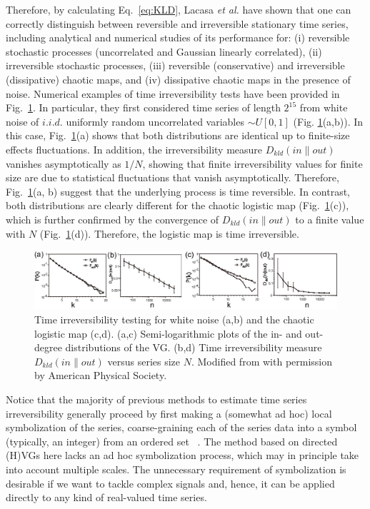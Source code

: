		Therefore, by calculating Eq.~\eqref{eq:KLD}, Lacasa \textit{et al.}\cite{Lacasa2012} have shown that one can correctly distinguish between reversible and irreversible stationary time series, including analytical and numerical studies of its performance for: (i) reversible stochastic processes (uncorrelated and Gaussian linearly correlated), (ii) irreversible stochastic processes, (iii) reversible (conservative) and irreversible (dissipative) chaotic maps, and (iv) dissipative chaotic maps in the presence of noise. Numerical examples of time irreversibility tests have been provided in Fig.~\ref{fig:chapter4timeReverse}. In particular, they first considered time series of length $2^{15}$ from white noise of $i.i.d.$ uniformly random uncorrelated variables $\sim U[0,1]$ (Fig. \ref{fig:chapter4timeReverse}(a,b)). In this case, Fig.~\ref{fig:chapter4timeReverse}(a) shows that both distributions are identical up to finite-size effects fluctuations. In addition, the irreversibility measure $D_{k l d}(in\|out)$ vanishes asymptotically as $1/N$, showing that finite irreversibility values for finite size are due to statistical fluctuations that vanish asymptotically. Therefore, Fig.~\ref{fig:chapter4timeReverse}(a, b) suggest that the underlying process is time reversible. In contrast, both distributions are clearly different for the chaotic logistic map (Fig.~\ref{fig:chapter4timeReverse}(c)), which is further confirmed by the convergence of $D_{k l d}(in\|out)$ to a finite value with $N$ (Fig.~\ref{fig:chapter4timeReverse}(d)). Therefore, the logistic map is time irreversible. 
		\begin{figure}[htbp]
		\centering
			\includegraphics[width=\columnwidth]{Chapter04_VisibilityGt/timeReverse.eps}
			\caption{Time irreversibility testing for white noise (a,b) and the chaotic logistic map (c,d). (a,c) Semi-logarithmic plots of the in- and out-degree distributions of the VG. (b,d) Time irreversibility measure $D_{k l d}(in\|out)$ versus series size $N$. Modified from \cite{Lacasa2015} with permission by American Physical Society. } \label{fig:chapter4timeReverse}
		\end{figure}
		
		Notice that the majority of previous methods to estimate time series irreversibility generally proceed by first making a (somewhat ad hoc) local symbolization of the series, coarse-graining each of the series data into a symbol (typically, an integer) from an ordered set ~\cite{Daw2000,Kennel2004,Cammarota2007,Costa2005,Porporato2007,Roldan2010}. The method based on directed (H)VGs here lacks an ad hoc symbolization process, which may in principle take into account multiple scales. The unnecessary requirement of symbolization is desirable if we want to tackle complex signals and, hence, it can be applied directly to any kind of real-valued time series.  

